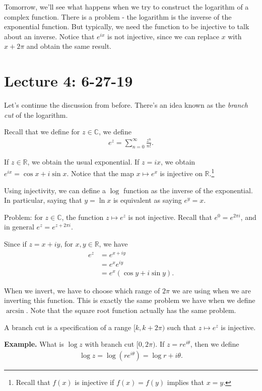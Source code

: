 \documentclass{article}
\begin{document}
Tomorrow, we'll see what happens when we try to construct the logarithm of a complex function.  There is a problem - the logarithm is the inverse of the exponential function.  But typically, we need the function to be injective to talk about an inverse.  Notice that $e^{ix}$ is not injective, since we can replace $x$ with $x + 2\pi$ and obtain the same result.

\section{Lecture 4: 6-27-19}

Let's continue the discussion from before.  There's an idea known as the {\it branch cut} of the logarithm.

Recall that we define for $z \in \mathbb{C}$, we define
\begin{align*}
  e^z = \sum_{n=0}^{\infty} \frac{z^n}{n!}.
\end{align*}

If $z \in \mathbb{R}$, we obtain the usual exponential.  If $z = ix$, we obtain $e^{ix} = \cos x + i \sin x$.  Notice that the map $x \mapsto e^x$ is injective on $\mathbb{R}$.\footnote{Recall that $f(x)$ is injective if $f(x) = f(y)$ implies that $x=y$.}

Using injectivity, we can define a $\log$ function as the inverse of the exponential.  In particular, saying that $y = \ln x$ is equivalent as saying $e^y = x$.

Problem: for $z \in \mathbb{C}$, the function $z \mapsto e^z$ is not injective.  Recall that $e^{0} = e^{2\pi i}$, and in general $e^z = e^{z + 2 \pi i}$.

Since if $z = x+iy$, for $x, y \in \mathbb{R}$, we have
\begin{align*}
  e^z &= e^{x+iy} \\
  &= e^x e^{iy} \\
  &= e^x (\cos y + i \sin y).
\end{align*}

When we invert, we have to choose which range of $2\pi$ we are using when we are inverting this function.  This is exactly the same problem we have when we define $\arcsin$.  Note that the square root function actually has the same problem.

A branch cut is a specification of a range $[k, k+2\pi)$ such that $z \mapsto e^z$ is injective.

{\bf Example.} What is $\log z$ with branch cut $[0, 2 \pi)$.  If $z = re^{i \theta}$, then we define
\begin{align*}
  \log z = \log (r e^{i \theta}) = \log r + i \theta.
\end{align*}
\end{document}
